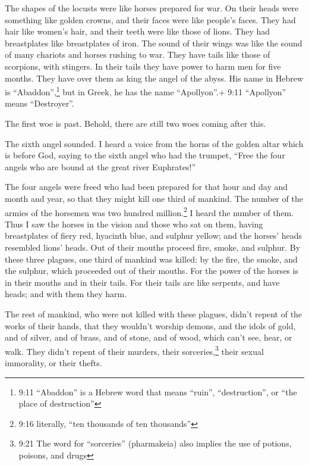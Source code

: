  The shapes of the locusts were like horses prepared for
war. On their heads were something like golden crowns, and their faces
were like people's faces.  They had hair like women's hair,
and their teeth were like those of lions.  They had
breastplates like breastplates of iron. The sound of their wings was
like the sound of many chariots and horses rushing to war. 
They have tails like those of scorpions, with stingers. In their tails
they have power to harm men for five months.  They have
over them as king the angel of the abyss. His name in Hebrew is
``Abaddon'',\footnote{9:11 ``Abaddon'' is a Hebrew word that means
  ``ruin'', ``destruction'', or ``the place of destruction''} but in
Greek, he has the name ``Apollyon''.+ 9:11 ``Apollyon'' means
``Destroyer''.

 The first woe is past. Behold, there are still two woes
coming after this.

 The sixth angel sounded. I heard a voice from the horns of
the golden altar which is before God,  saying to the sixth
angel who had the trumpet, ``Free the four angels who are bound at the
great river Euphrates!''

 The four angels were freed who had been prepared for that
hour and day and month and year, so that they might kill one third of
mankind.  The number of the armies of the horsemen was two
hundred million.\footnote{9:16 literally, ``ten thousands of ten
  thousands''} I heard the number of them.  Thus I saw the
horses in the vision and those who sat on them, having breastplates of
fiery red, hyacinth blue, and sulphur yellow; and the horses' heads
resembled lions' heads. Out of their mouths proceed fire, smoke, and
sulphur.  By these three plagues, one third of mankind was
killed: by the fire, the smoke, and the sulphur, which proceeded out of
their mouths.  For the power of the horses is in their
mouths and in their tails. For their tails are like serpents, and have
heads; and with them they harm.

 The rest of mankind, who were not killed with these
plagues, didn't repent of the works of their hands, that they wouldn't
worship demons, and the idols of gold, and of silver, and of brass, and
of stone, and of wood, which can't see, hear, or walk. 
They didn't repent of their murders, their sorceries,\footnote{9:21 The
  word for ``sorceries'' (pharmakeia) also implies the use of potions,
  poisons, and drugs} their sexual immorality, or their thefts.

